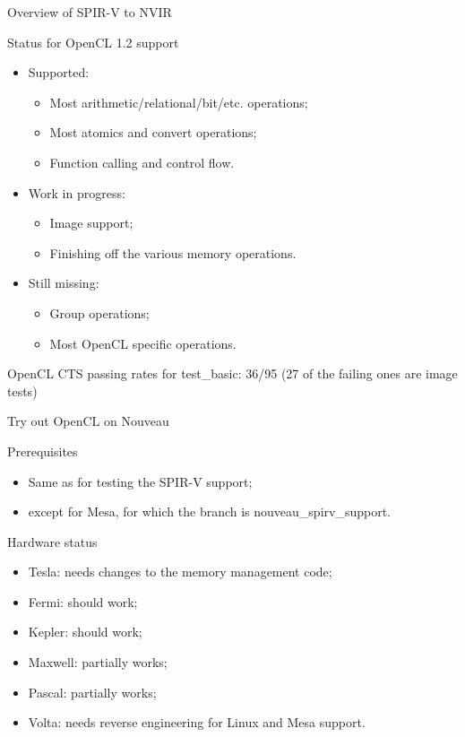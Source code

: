 \documentclass[11pt,english,compress]{beamer}
\begin{document}
\begin{frame}{Overview of SPIR-V to NVIR}
	\begin{block}{Status for OpenCL 1.2 support}
		\begin{itemize}
			\item Supported:
			\begin{itemize}
				\item Most arithmetic/relational/bit/etc. operations;
				\item Most atomics and convert operations;
				\item Function calling and control flow.
			\end{itemize}
			\item Work in progress:
			\begin{itemize}
				\item Image support;
				\item Finishing off the various memory operations.
			\end{itemize}
			\item Still missing:
			\begin{itemize}
				\item Group operations;
				\item Most OpenCL specific operations.
			\end{itemize}
		\end{itemize}

		OpenCL CTS passing rates for test\_basic: 36/95 (27 of the
		failing ones are image tests)
	\end{block}
\end{frame}

\begin{frame}{Try out OpenCL on Nouveau}
	\begin{block}{Prerequisites}
		\begin{itemize}
			\item Same as for testing the SPIR-V support;
			\item except for Mesa, for which the branch is
				nouveau\_spirv\_support.
		\end{itemize}
	\end{block}
	\begin{block}{Hardware status}
		\begin{itemize}
			\item Tesla: needs changes to the memory management
				code;
			\item Fermi: should work;
			\item Kepler: should work;
			\item Maxwell: partially works;
			\item Pascal: partially works;
			\item Volta: needs reverse engineering for Linux and
				Mesa support.
		\end{itemize}
	\end{block}
\end{frame}
\end{document}
